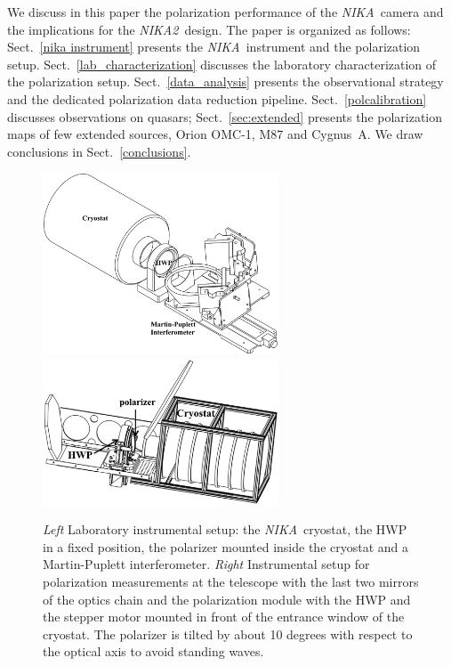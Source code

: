 \documentclass[twocolumn, traditabstract]{aa}
\newcommand{\nika}{{\it NIKA}}
\newcommand{\nikad}{{\it NIKA2}}
\begin{document}
We discuss in this paper the
polarization performance of the \nika\ camera and the implications for the
\nikad\ design.
The paper is organized as follows: Sect.~\ref{nika instrument} presents the
\nika\ instrument and the polarization
setup. 
Sect.~\ref{lab_characterization} discusses the laboratory
characterization of the polarization setup. Sect.~\ref{data_analysis}
presents the observational strategy and the dedicated polarization data reduction
pipeline.  Sect.~\ref{polcalibration} discusses
observations on quasars; Sect.~\ref{sec:extended} presents the polarization
maps of few extended sources, Orion OMC-1, M87 and Cygnus~A. 
We draw conclusions in  Sect.~\ref{conclusions}.
\begin{figure}
  \begin{center}
    \includegraphics[width=7cm, keepaspectratio]{Lab_test_config.eps}
    \includegraphics[width=7cm, keepaspectratio]{setup_polar_telescope.eps}
    \caption{{\it Left} Laboratory instrumental setup: the \nika\ cryostat,
      the HWP in a fixed position, the polarizer mounted inside the cryostat and a Martin-Puplett interferometer. {\it Right}
      Instrumental setup for polarization measurements at the telescope with the last two mirrors of the optics chain and the polarization
        module with the HWP and the stepper motor mounted in front of the
        entrance window of the cryostat. The polarizer is tilted by about 10
        degrees with respect to the optical axis to avoid standing waves.}
         \label{polarsetup}
  \end{center}
\end{figure}
\end{document}
